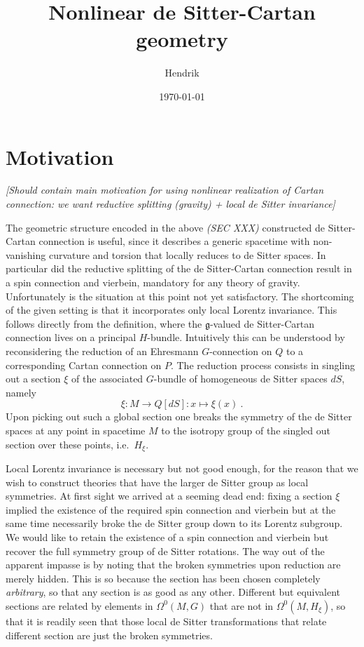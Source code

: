 \documentclass[11pt]{article}
\title{Nonlinear de Sitter-Cartan geometry}
\author{Hendrik}
\date{\today}
\begin{document}
\maketitle
\tableofcontents

\section{Motivation}
{\blu \it [Should contain main motivation for using nonlinear 
	realization of Cartan connection: we want reductive splitting 
	(gravity) + local de Sitter invariance]}


The geometric structure encoded in the above {\blu\it (SEC XXX)} 
constructed de Sitter-Cartan connection is useful, since it 
describes a generic spacetime with non-vanishing curvature and 
torsion that locally reduces to de Sitter spaces. In particular 
did the reductive splitting of the de Sitter-Cartan connection 
result in a spin connection and vierbein, mandatory for any 
theory of gravity.  Unfortunately is the situation at this point 
not yet satisfactory. The shortcoming of the given setting is 
that it incorporates only local Lorentz invariance. This follows 
directly from the definition, where the $\mathfrak{g}$-valued de 
Sitter-Cartan connection lives on a principal $H$-bundle.  
Intuitively this can be understood by reconsidering the reduction 
of an Ehresmann $G$-connection on $Q$ to a corresponding Cartan 
connection on $P$. The reduction process consists in singling out 
a section $\xi$ of the associated $G$-bundle of homogeneous de 
Sitter spaces $dS$, namely
\begin{displaymath}
	\xi : M \to Q[dS] : x \mapsto \xi(x)~.
\end{displaymath}
Upon picking out such a global section one breaks the symmetry of 
the de Sitter spaces at any point in spacetime $M$ to the 
isotropy group of the singled out section over these points, 
i.e.~$H_\xi$.

Local Lorentz invariance is necessary but not good enough, for 
the reason that we wish to construct theories that have the 
larger de Sitter group as local symmetries. At first sight we 
arrived at a seeming dead end: fixing a section $\xi$ implied the 
existence of the required spin connection and vierbein but at the 
same time necessarily broke the de Sitter group down to its 
Lorentz subgroup. We would like to retain the existence of a spin 
connection and vierbein but recover the full symmetry group of de 
Sitter rotations. The way out of the apparent impasse is by 
noting that the broken symmetries upon reduction are merely 
hidden. This is so because the section has been chosen completely 
\emph{arbitrary}, so that any section is as good as any other.  
Different but equivalent sections are related by elements in 
$\Omega^0(M,G)$ that are not in $\Omega^0(M,H_\xi)$, so that it 
is readily seen that those local de Sitter transformations that
relate different section are just the broken symmetries.
\end{document}
